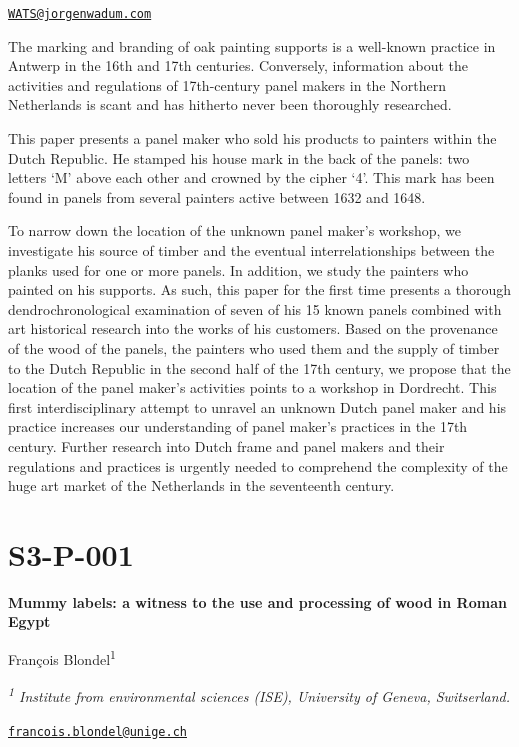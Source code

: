 \documentclass[
]{book}
\begin{document}
\href{mailto:WATS@jorgenwadum.com}{\nolinkurl{WATS@jorgenwadum.com}}

The marking and branding of oak painting supports is a well-known practice in Antwerp in the 16th and 17th centuries. Conversely, information about the activities and regulations of 17th-century panel makers in the Northern Netherlands is scant and has hitherto never been thoroughly researched.

This paper presents a panel maker who sold his products to painters within the Dutch Republic. He stamped his house mark in the back of the panels: two letters `M' above each other and crowned by the cipher `4'. This mark has been found in panels from several painters active between 1632 and 1648.

To narrow down the location of the unknown panel maker's workshop, we investigate his source of timber and the eventual interrelationships between the planks used for one or more panels. In addition, we study the painters who painted on his supports. As such, this paper for the first time presents a thorough dendrochronological examination of seven of his 15 known panels combined with art historical research into the works of his customers. Based on the provenance of the wood of the panels, the painters who used them and the supply of timber to the Dutch Republic in the second half of the 17th century, we propose that the location of the panel maker's activities points to a workshop in Dordrecht. This first interdisciplinary attempt to unravel an unknown Dutch panel maker and his practice increases our understanding of panel maker's practices in the 17th century. Further research into Dutch frame and panel makers and their regulations and practices is urgently needed to comprehend the complexity of the huge art market of the Netherlands in the seventeenth century.

\hypertarget{s3-p-001}{%
\section*{S3-P-001}\label{s3-p-001}}

\textbf{Mummy labels: a witness to the use and processing of wood in Roman Egypt}

François Blondel\textsuperscript{1}

\emph{\textsuperscript{1} Institute from environmental sciences (ISE), University of Geneva, Switserland.}

\href{mailto:francois.blondel@unige.ch}{\nolinkurl{francois.blondel@unige.ch}}
\end{document}
